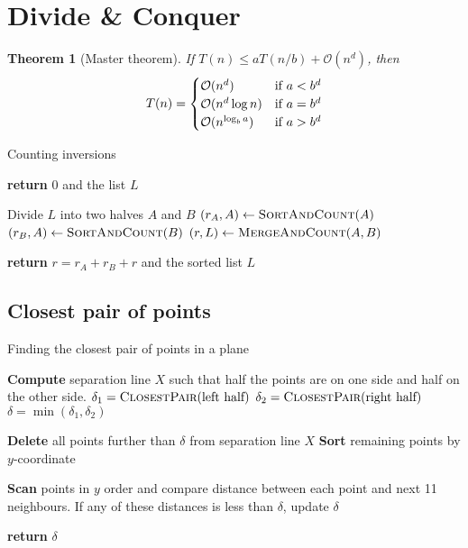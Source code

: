 \documentclass[10pt, oneside, reqno]{amsart}
\theoremstyle{plain}%
\newtheorem{thm}{Theorem}[section]
\theoremstyle{definition}
\theoremstyle{remark}
\newcommand{\bigo}[1]{\mathcal{O}(#1)}
\begin{document}


\section{Divide \& Conquer} %
\label{sec:divide_&_conquer}

\begin{thm}[Master theorem]
	If $T(n) \leq a T(n/b) + \bigo{n^d}$, then \[
		T(n) = \begin{cases}
			\bigo{n^d} & \text{if $a < b^d$}\\
			\bigo{n^d \log n} &\text{if $a = b^d$}\\
			\bigo{n^{\log_b a}} & \text{if $ a  > b^d$}
		\end{cases}
	\]
\end{thm}
\begin{algorithm}[H]
	\label{alg:dynamic_rising_trend}
	\caption{Counting inversions}
	\begin{algorithmic}[1]
				\State \textbf{return} 0 and the list $L$
			\EndIf
			
			\State Divide $L$ into two halves $A$ and $B$
			\State $(r_A, A) \gets \textsc{SortAndCount}(A)$
			\State $(r_B, A) \gets \textsc{SortAndCount}(B)$
			\State $(r, L) \gets \textsc{MergeAndCount}(A,B)$
			
			\State
			\State \textbf{return} $r = r_A + r_B + r$ and the sorted list $L$
	\EndProcedure
	\end{algorithmic}
\end{algorithm}



\subsection{Closest pair of points} %
\label{sub:closest_pair_of_points}

\begin{algorithm}[H]
	\label{alg:dynamic_rising_trend}
	\caption{Finding the closest pair of points in a plane}
	\begin{algorithmic}[1]
			\State \textbf{Compute} separation line $X$ such that half the points are on one side and half on the other side.
			\State 
			\State $\delta_1 = \textsc{ClosestPair}(\text{left half})$
			\State $\delta_2 = \textsc{ClosestPair}(\text{right half})$
			\State $\delta = \min(\delta_1, \delta_2)$
			
			\State
			\State \textbf{Delete} all points further than $\delta$ from separation line $X$
			\State \textbf{Sort} remaining points by $y$-coordinate
			
			\State \textbf{Scan} points in $y$ order and compare distance between each point and next 11 neighbours.  If any of these distances is less than $\delta$, update $\delta$
			
			\State 
			\State \textbf{return} $\delta$
	\EndProcedure
	\end{algorithmic}
\end{algorithm}
\end{document}
